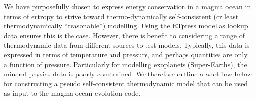 We have purposefully chosen to express energy conservation in a magma ocean in terms of entropy to strive toward thermo-dynamically self-consistent (or least thermodynamically ``reasonable'') modelling.  Using the RTpress model as lookup data \citep{WB18} ensures this is the case.  However, there is benefit to considering a range of thermodynamic data from different sources to test models.  Typically, this data is expressed in terms of temperature and pressure, and perhaps quantities are only a function of pressure.  Particularly for modelling exoplanets (Super-Earths), the mineral physics data is poorly constrained.  We therefore outline a workflow below for constructing a pseudo self-consistent thermodynamic model that can be used as input to the magma ocean evolution code. 

